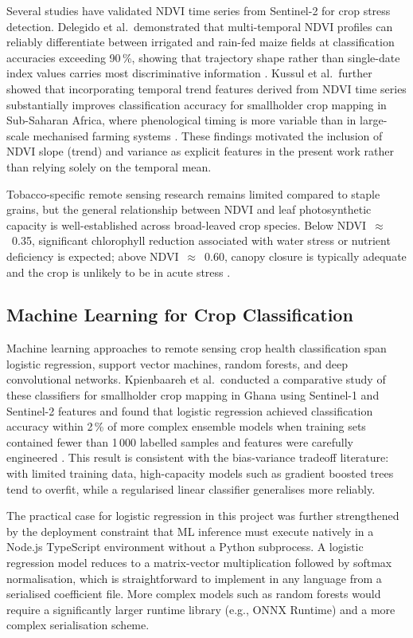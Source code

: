 \documentclass[conference]{IEEEtran}
\begin{document}
Several studies have validated NDVI time series from Sentinel-2 for crop
stress detection. Delegido et al.\ demonstrated that multi-temporal NDVI
profiles can reliably differentiate between irrigated and rain-fed maize
fields at classification accuracies exceeding 90\,\%, showing that
trajectory shape rather than single-date index values carries most
discriminative information \cite{delegido2011}. Kussul et al.\ further
showed that incorporating temporal trend features derived from NDVI time
series substantially improves classification accuracy for smallholder
crop mapping in Sub-Saharan Africa, where phenological timing is more
variable than in large-scale mechanised farming systems
\cite{kussul2017}. These findings motivated the inclusion of NDVI slope
(trend) and variance as explicit features in the present work rather than
relying solely on the temporal mean.

Tobacco-specific remote sensing research remains limited compared to
staple grains, but the general relationship between NDVI and leaf
photosynthetic capacity is well-established across broad-leaved crop
species. Below NDVI~$\approx$~0.35, significant chlorophyll reduction
associated with water stress or nutrient deficiency is expected; above
NDVI~$\approx$~0.60, canopy closure is typically adequate and the crop
is unlikely to be in acute stress \cite{xue2017}.

\subsection{Machine Learning for Crop Classification}

Machine learning approaches to remote sensing crop health classification
span logistic regression, support vector machines, random forests, and
deep convolutional networks. Kpienbaareh et al.\ conducted a comparative
study of these classifiers for smallholder crop mapping in Ghana using
Sentinel-1 and Sentinel-2 features and found that logistic regression
achieved classification accuracy within 2\,\% of more complex ensemble
models when training sets contained fewer than 1\,000 labelled samples
and features were carefully engineered \cite{kpienbaareh2021}. This
result is consistent with the bias-variance tradeoff literature: with
limited training data, high-capacity models such as gradient boosted
trees tend to overfit, while a regularised linear classifier generalises
more reliably.

The practical case for logistic regression in this project was further
strengthened by the deployment constraint that ML inference must execute
natively in a Node.js TypeScript environment without a Python subprocess.
A logistic regression model reduces to a matrix-vector multiplication
followed by softmax normalisation, which is straightforward to implement
in any language from a serialised coefficient file. More complex models
such as random forests would require a significantly larger runtime
library (e.g., ONNX Runtime) and a more complex serialisation scheme.
\end{document}
